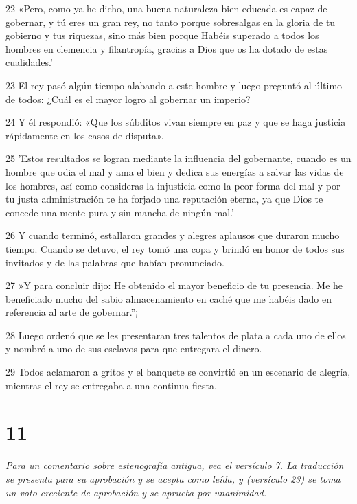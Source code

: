 \par 22 «Pero, como ya he dicho, una buena naturaleza bien educada es capaz de gobernar, y tú eres un gran rey, no tanto porque sobresalgas en la gloria de tu gobierno y tus riquezas, sino más bien porque Habéis superado a todos los hombres en clemencia y filantropía, gracias a Dios que os ha dotado de estas cualidades.'

\par 23 El rey pasó algún tiempo alabando a este hombre y luego preguntó al último de todos: ¿Cuál es el mayor logro al gobernar un imperio?

\par 24 Y él respondió: «Que los súbditos vivan siempre en paz y que se haga justicia rápidamente en los casos de disputa».

\par 25 'Estos resultados se logran mediante la influencia del gobernante, cuando es un hombre que odia el mal y ama el bien y dedica sus energías a salvar las vidas de los hombres, así como consideras la injusticia como la peor forma del mal y por tu justa administración te ha forjado una reputación eterna, ya que Dios te concede una mente pura y sin mancha de ningún mal.'

\par 26 Y cuando terminó, estallaron grandes y alegres aplausos que duraron mucho tiempo. Cuando se detuvo, el rey tomó una copa y brindó en honor de todos sus invitados y de las palabras que habían pronunciado.

\par 27 »Y para concluir dijo: He obtenido el mayor beneficio de tu presencia. Me he beneficiado mucho del sabio almacenamiento en caché que me habéis dado en referencia al arte de gobernar.''¡

\par 28 Luego ordenó que se les presentaran tres talentos de plata a cada uno de ellos y nombró a uno de sus esclavos para que entregara el dinero.

\par 29 Todos aclamaron a gritos y el banquete se convirtió en un escenario de alegría, mientras el rey se entregaba a una continua fiesta.

\chapter{11}

\par \textit{Para un comentario sobre estenografía antigua, vea el versículo 7. La traducción se presenta para su aprobación y se acepta como leída, y (versículo 23) se toma un voto creciente de aprobación y se aprueba por unanimidad.}

